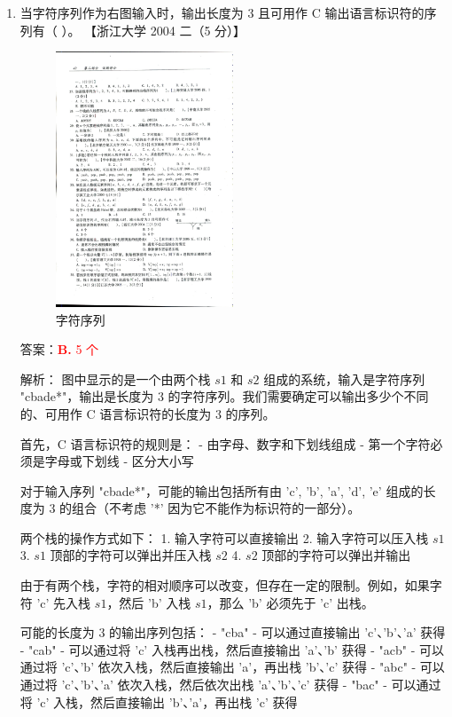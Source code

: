 \documentclass[lang=cn,newtx,10pt,scheme=chinese]{../../../elegantbook}
\begin{document}
\begin{enumerate}
    \item 当字符序列作为右图输入时，输出长度为 3 且可用作 C 输出语言标识符的序列有（ ）。  
    【浙江大学 2004 二（5 分）】  

    \begin{figure}[h!]
        \centering
        \includegraphics[width=0.5\textwidth]{../../figure/exercisePicPDF/chapter3/3-35.pdf}
        \caption{字符序列}
        \label{fig:linear_list_1}
    \end{figure}
    
    答案：\textcolor{red}{\textbf{B.} 5 个}

    解析：
    图中显示的是一个由两个栈 $s1$ 和 $s2$ 组成的系统，输入是字符序列 "cbade*"，输出是长度为 3 的字符序列。我们需要确定可以输出多少个不同的、可用作 C 语言标识符的长度为 3 的序列。

    首先，C 语言标识符的规则是：
    - 由字母、数字和下划线组成
    - 第一个字符必须是字母或下划线
    - 区分大小写
    
    对于输入序列 "cbade*"，可能的输出包括所有由 'c', 'b', 'a', 'd', 'e' 组成的长度为 3 的组合（不考虑 '*' 因为它不能作为标识符的一部分）。

    两个栈的操作方式如下：
    1. 输入字符可以直接输出
    2. 输入字符可以压入栈 $s1$
    3. $s1$ 顶部的字符可以弹出并压入栈 $s2$
    4. $s2$ 顶部的字符可以弹出并输出

    由于有两个栈，字符的相对顺序可以改变，但存在一定的限制。例如，如果字符 'c' 先入栈 $s1$，然后 'b' 入栈 $s1$，那么 'b' 必须先于 'c' 出栈。

    可能的长度为 3 的输出序列包括：
    - "cba" - 可以通过直接输出 'c'、'b'、'a' 获得
    - "cab" - 可以通过将 'c' 入栈再出栈，然后直接输出 'a'、'b' 获得
    - "acb" - 可以通过将 'c'、'b' 依次入栈，然后直接输出 'a'，再出栈 'b'、'c' 获得
    - "abc" - 可以通过将 'c'、'b'、'a' 依次入栈，然后依次出栈 'a'、'b'、'c' 获得
    - "bac" - 可以通过将 'c' 入栈，然后直接输出 'b'、'a'，再出栈 'c' 获得


\end{enumerate}
\end{document}

